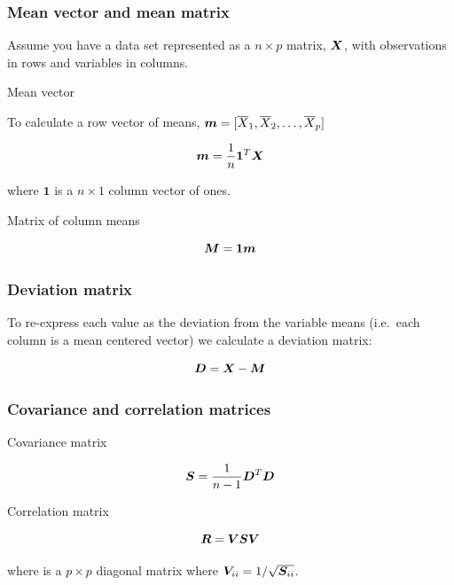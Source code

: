 \documentclass{beamer}
\begin{document}
\begin{frame}
  \frametitle{Mean vector and mean matrix}

Assume you have a data set represented as a $n \times p$ matrix, $\bm{X}$, with
observations in rows and variables in columns.

\begin{block}{Mean vector}

To calculate a row vector of means, $\bm{m} = [\overline{X}_1, \overline{X}_2, \ldots, \overline{X}_p ]$

	\[
	\bm{m} = \frac{1}{n} \mathbf{1}^T  \bm{X}
	\]

where $\mathbf{1}$ is a $n \times 1$ column vector of ones.

\end{block}

\begin{block}{Matrix of column means}

	\[
	\bm{M} = \mathbf{1}\bm{m}
	\]

\end{block}

\end{frame}

\begin{frame}
	\frametitle{Deviation matrix}

To re-express each value as the deviation from the variable means
(i.e.~each column is a mean centered vector) we calculate a deviation
matrix: 

\[
\bm{D} = \bm{X} - \bm{M}
\]

\end{frame}



\begin{frame}
	\frametitle{Covariance and correlation matrices}

\begin{block}{Covariance matrix}
	
\[
\bm{S} = \frac{1}{n-1} \bm{D}^T \bm{D}
\]

\end{block}

\begin{block}{Correlation matrix}

\[
\bm{R} = \bm{V} \bm{S} \bm{V}
\]

where  is a $p \times p$ diagonal matrix where
$\bm{V}_{ii} = 1/\sqrt{\bm{S}_{ii}}$.
	
\end{block}

\end{frame}
\end{document}
